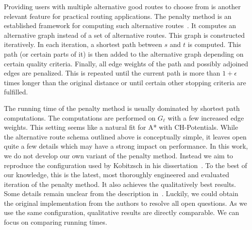 \documentclass[a4paper, english, cleveref]{lipics-v2021}
\begin{document}
Providing users with multiple alternative good routes to choose from is another relevant feature for practical routing applications.
The penalty method is an established framework for computing such alternative routes~\cite{bdgs-argrn-11,krs-eepma-13,pz-iarp-13,kobitzsch2015alternative}.
It computes an alternative graph instead of a set of alternative routes.
This graph is constructed iteratively.
In each iteration, a shortest path between $s$ and $t$ is computed.
This path (or certain parts of it) is then added to the alternative graph depending on certain quality criteria.
Finally, all edge weights of the path and possibly adjoined edges are penalized.
This is repeated until the current path is more than $1 + \epsilon$ times longer than the original distance or until certain other stopping criteria are fulfilled.

The running time of the penalty method is usually dominated by shortest path computations.
The computations are performed on $G_{\ell}$ with a few increased edge weights.
This setting seems like a natural fit for A* with CH-Potentials.
While the alternative route schema outlined above is conceptually simple, it leaves open quite a few details which may have a strong impact on performance.
In this work, we do not develop our own variant of the penalty method.
Instead we aim to reproduce the configuration used by Kobitzsch in his dissertation~\cite{kobitzsch2015alternative}.
To the best of our knowledge, this is the latest, most thoroughly engineered and evaluated iteration of the penalty method.
It also achieves the qualitatively best results.
Some details remain unclear from the description in~\cite{kobitzsch2015alternative}.
Luckily, we could obtain the original implementation from the authors to resolve all open questions.
As we use the same configuration, qualitative results are directly comparable.
We can focus on comparing running times.
\end{document}

